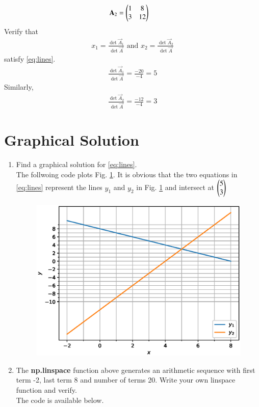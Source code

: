 \documentclass[journal,12pt,twocolumn]{IEEEtran}
\renewcommand\thesection{\arabic{section}}
\begin{document}
\begin{enumerate}[label=\thesection.\arabic*
,ref=\thesection.\theenumi]
\begin{align}
\\
\mathbf{A}_2&= \begin{pmatrix}1 & 8 \\ 3 & 12\end{pmatrix}
\end{align}
%
Verify that 
\begin{align}
\label{eq:sol_det}
x_1 = \frac{\det{\vec{A}_1}}{\det{\vec{A}}} \text{ and } x_2 = \frac{\det{\vec{A}_2}}{\det{\vec{A}}}
\end{align}
satisfy \eqref{eq:lines}.
\\
\solution 
\begin{align}
\frac{\det{\vec{A}_1}}{\det{\vec{A}}}  = \frac{-20}{-4} = 5
\end{align}
Similarly, 
\begin{align}
\frac{\det{\vec{A}_2}}{\det{\vec{A}}}  = \frac{-12}{-4} = 3
\end{align}
%

\end{enumerate}

\section{Graphical Solution}
\begin{enumerate}[label=\thesection.\arabic*
,ref=\thesection.\theenumi]
\item Find a graphical solution for \eqref{eq:lines}.
\label{prob:graph}
\\
\solution The follwoing code plots Fig. \ref{fig:draw_line}.  It is obvious that the two equations in 
\eqref{eq:lines} represent the lines $y_1$ and $y_2$ in Fig. \ref{fig:draw_line} and intersect at $\begin{pmatrix}5 
\\3\end{pmatrix}$

%
\begin{figure}
\centering
\includegraphics[width=\columnwidth]{./figs/draw_line.eps}
\caption{}
\label{fig:draw_line}
\end{figure}
\item The \textbf{np.linspace} function above generates an arithmetic sequence with first term -2, last term 8 
and 
number of terms 20.  Write your own linspace function and verify.
\\
\solution The code is available below.

\end{enumerate}
\end{document}
